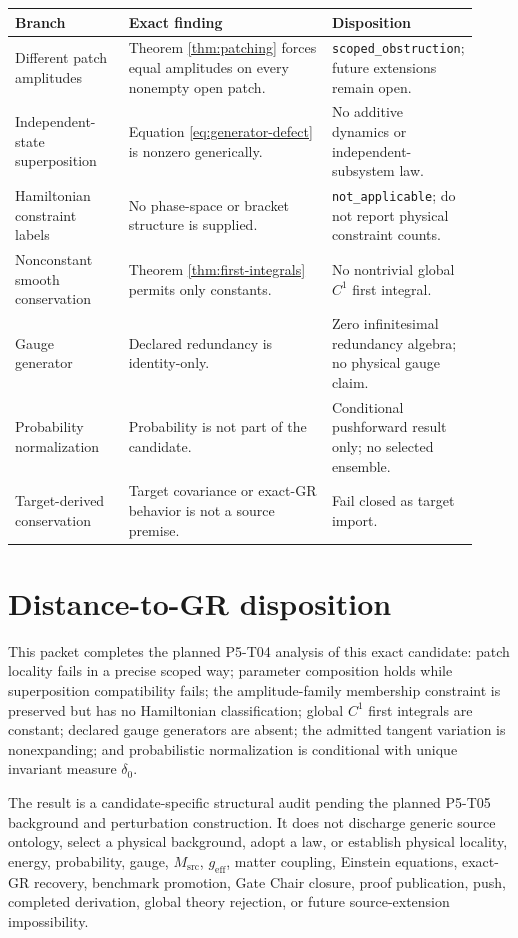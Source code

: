 \documentclass[11pt]{article}
\begin{document}
\begin{longtable}{p{0.25\linewidth}p{0.47\linewidth}p{0.20\linewidth}}
\toprule
Branch & Exact finding & Disposition\\
\midrule
\endhead
Different patch amplitudes &
Theorem \ref{thm:patching} forces equal amplitudes on every nonempty open
patch. &
\texttt{scoped\_obstruction}; future extensions remain open.\\
Independent-state superposition &
Equation \eqref{eq:generator-defect} is nonzero generically. &
No additive dynamics or independent-subsystem law.\\
Hamiltonian constraint labels &
No phase-space or bracket structure is supplied. &
\texttt{not\_applicable}; do not report physical constraint counts.\\
Nonconstant smooth conservation &
Theorem \ref{thm:first-integrals} permits only constants. &
No nontrivial global \(C^1\) first integral.\\
Gauge generator &
Declared redundancy is identity-only. &
Zero infinitesimal redundancy algebra; no physical gauge claim.\\
Probability normalization &
Probability is not part of the candidate. &
Conditional pushforward result only; no selected ensemble.\\
Target-derived conservation &
Target covariance or exact-GR behavior is not a source premise. &
Fail closed as target import.\\
\bottomrule
\end{longtable}

\section{Distance-to-GR disposition}

This packet completes the planned P5-T04 analysis of this exact candidate:
patch locality fails in a precise scoped way; parameter composition holds
while superposition compatibility fails; the amplitude-family membership
constraint is preserved but has no Hamiltonian classification; global
\(C^1\) first integrals are constant; declared gauge generators are absent;
the admitted tangent variation is nonexpanding; and probabilistic
normalization is conditional with unique invariant measure \(\delta_0\).

The result is a candidate-specific structural audit pending the planned P5-T05
background and perturbation construction.  It does not discharge generic
source ontology, select a physical background, adopt a law, or establish
physical locality, energy, probability, gauge, \(M_{\mathrm{src}}\),
\(g_{\mathrm{eff}}\), matter coupling, Einstein equations, exact-GR recovery,
benchmark promotion, Gate Chair closure, proof publication, push, completed
derivation, global theory rejection, or future source-extension
impossibility.
\end{document}
